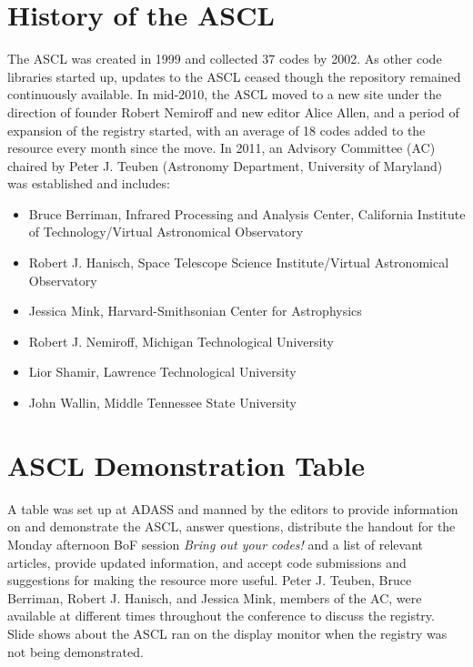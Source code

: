 \section{History of the ASCL}

The ASCL was created in 1999 and collected 37 codes by 2002. As other code libraries started up, updates to the ASCL ceased though the repository remained continuously available. In mid-2010, the ASCL moved to a new site under the direction of founder Robert Nemiroff and new editor Alice Allen, and a period of expansion of the registry started, with an average of 18 codes added to the resource every month since the move. In 2011, an Advisory Committee (AC) chaired by Peter J. Teuben (Astronomy Department, University of Maryland) was established and includes: 
\begin{itemize}
\item Bruce Berriman, Infrared Processing and Analysis Center, California Institute of Technology/Virtual Astronomical Observatory
\item Robert J. Hanisch, Space Telescope Science Institute/Virtual Astronomical Observatory
\item Jessica Mink, Harvard-Smithsonian Center for Astrophysics
\item Robert J. Nemiroff, Michigan Technological University
\item Lior Shamir, Lawrence Technological University
\item John Wallin, Middle Tennessee State University
\end{itemize}

\section{ASCL Demonstration Table}

A table was set up at ADASS and manned by the editors to provide information on and demonstrate the ASCL, answer questions, distribute the handout for the Monday afternoon BoF session {\em Bring out your codes!} \citep{allen12XXII} and a list of relevant articles, provide updated information, and accept code submissions and suggestions for making the resource more useful. Peter J. Teuben,  Bruce Berriman, Robert J. Hanisch, and Jessica Mink, members of the AC, were available at different times throughout the conference to discuss the registry. Slide shows about the ASCL ran on the display monitor when the registry was not being demonstrated.

